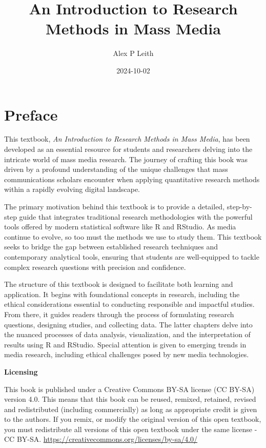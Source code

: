 \documentclass[
]{book}
\title{An Introduction to Research Methods in Mass Media}
\author{Alex P Leith}
\date{2024-10-02}
\begin{document}
\maketitle

{
\setcounter{tocdepth}{1}
\tableofcontents
}
\chapter*{Preface}\label{preface}

This textbook, \emph{An Introduction to Research Methods in Mass Media}, has been developed as an essential resource for students and researchers delving into the intricate world of mass media research. The journey of crafting this book was driven by a profound understanding of the unique challenges that mass communications scholars encounter when applying quantitative research methods within a rapidly evolving digital landscape.

The primary motivation behind this textbook is to provide a detailed, step-by-step guide that integrates traditional research methodologies with the powerful tools offered by modern statistical software like R and RStudio. As media continue to evolve, so too must the methods we use to study them. This textbook seeks to bridge the gap between established research techniques and contemporary analytical tools, ensuring that students are well-equipped to tackle complex research questions with precision and confidence.

The structure of this textbook is designed to facilitate both learning and application. It begins with foundational concepts in research, including the ethical considerations essential to conducting responsible and impactful studies. From there, it guides readers through the process of formulating research questions, designing studies, and collecting data. The latter chapters delve into the nuanced processes of data analysis, visualization, and the interpretation of results using R and RStudio. Special attention is given to emerging trends in media research, including ethical challenges posed by new media technologies.

\textbf{Licensing}

This book is published under a Creative Commons BY-SA license (CC BY-SA) version 4.0. This means that this book can be reused, remixed, retained, revised and redistributed (including commercially) as long as appropriate credit is given to the authors. If you remix, or modify the original version of this open textbook, you must redistribute all versions of this open textbook under the same license - CC BY-SA. \url{https://creativecommons.org/licenses/by-sa/4.0/}
\end{document}
